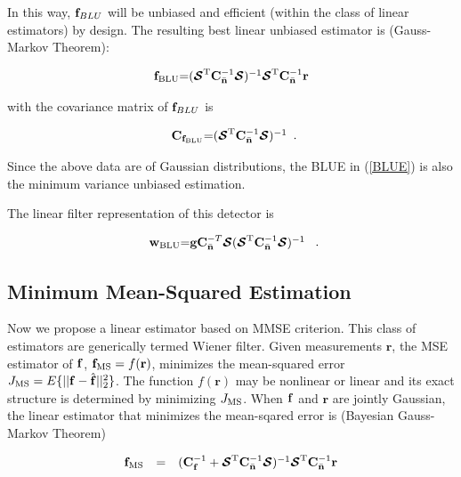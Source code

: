 \documentclass[a4paper,11pt,fleqn]{article}
\newcommand{\br}{{\mathbf r}}
\newcommand{\bC}{{\bf C}}
\newcommand{\bg}{{\bf g}}
\newcommand{\bn}{{\bf n}}
\newcommand{\bw}{{\bf w}}
\newcommand{\bbf}{{\bf f}}
\newcommand{\bcS}{{\mbox {\boldmath ${\cal S}$}}}
\begin{document}
In this way, ${\bbf}_{BLU}$ will be unbiased and efficient (within
the class of linear estimators) by design. The resulting best
linear unbiased estimator is (Gauss-Markov Theorem):

\begin{equation}
\begin{array}{rcl}
{\bbf}_{\rm BLU}$=$(\bcS^{\rm
T}\bC_{\bar{\bn}}^{-1}\bcS)^{-1}\bcS^{\rm
T}\bC_{\bar{\bn}}^{-1}\br
\end{array} \label{BLUE}
\end{equation}

\noindent with the covariance matrix of ${\bbf}_{BLU}$ is

\begin{equation}
\begin{array}{rcl}
{\bC}_{\bbf_{\rm BLU}}$=$(\bcS^{\rm
T}\bC_{\bar{\bn}}^{-1}\bcS)^{-1}
\end{array}.
\end{equation}

\noindent Since the above data are of Gaussian distributions, the
BLUE in (\ref{BLUE}) is also the minimum variance unbiased
estimation.

The linear filter representation of this detector is

\begin{equation}
\begin{array}{rcl}
{\bw}_{\rm BLU}$=$\bg\bC_{\bar{\bn}}^{-T}\bcS(\bcS^{\rm
T}\bC_{\bar{\bn}}^{-1}\bcS)^{-1}\
\end{array}. \label{w_BLUE}
\end{equation}



\subsection{Minimum Mean-Squared Estimation}
Now we propose a linear estimator based on MMSE criterion. This
class of estimators are generically termed Wiener filter. Given
measurements $\br$, the MSE estimator of $\bbf$, ${\bbf}_{\rm MS}
= f( \br )$, minimizes the mean-squared error $J_{\rm
MS}=E\{||\bbf-\hat{\bbf}||_2^2\}$. The function $f(\br)$ may be
nonlinear or linear and its exact structure is determined by
minimizing $J_{\rm MS}$. When $\bbf$ and $\br$ are jointly
Gaussian, the linear estimator that minimizes the mean-sqared
error is (Bayesian Gauss-Markov Theorem)

\begin{equation}
\begin{array}{rcl}
{\bbf}_{\rm MS} &=& (\bC_{\bbf}^{-1}+\bcS^{\rm
T}\bC_{\bar{\bn}}^{-1}\bcS)^{-1}\bcS^{\rm
T}\bC_{\bar{\bn}}^{-1}\br
\end{array} \label{MSE}
\end{equation}
\end{document}
